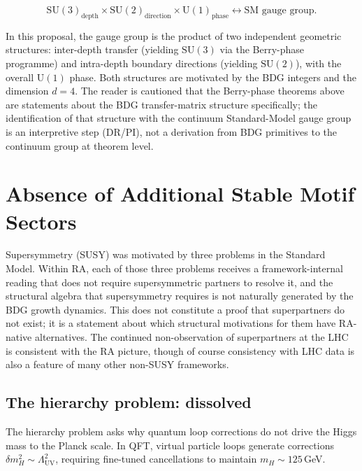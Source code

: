 \documentclass[11pt]{article}
\begin{document}
\begin{equation}
\boxed{\mathrm{SU}(3)_{\mathrm{depth}}\times\mathrm{SU}(2)_{\mathrm{direction}}\times\mathrm{U}(1)_{\mathrm{phase}} \leftrightarrow \text{SM gauge group}.}
\end{equation}

In this proposal, the gauge group is the product of two independent geometric structures: inter-depth transfer (yielding $\mathrm{SU}(3)$ via the Berry-phase programme) and intra-depth boundary directions (yielding $\mathrm{SU}(2)$), with the overall $\mathrm{U}(1)$ phase. Both structures are motivated by the BDG integers and the dimension $d=4$. The reader is cautioned that the Berry-phase theorems above are statements about the BDG transfer-matrix structure specifically; the identification of that structure with the continuum Standard-Model gauge group is an interpretive step (DR/PI), not a derivation from BDG primitives to the continuum group at theorem level.

\section{Absence of Additional Stable Motif Sectors}
\label{sec:susy}

Supersymmetry (SUSY) was motivated by three problems in the Standard Model. Within RA, each of those three problems receives a framework-internal reading that does not require supersymmetric partners to resolve it, and the structural algebra that supersymmetry requires is not naturally generated by the BDG growth dynamics. This does not constitute a proof that superpartners do not exist; it is a statement about which structural motivations for them have RA-native alternatives. The continued non-observation of superpartners at the LHC is consistent with the RA picture, though of course consistency with LHC data is also a feature of many other non-SUSY frameworks.

\subsection{The hierarchy problem: dissolved}

The hierarchy problem asks why quantum loop corrections do not drive the Higgs mass to the Planck scale. In QFT, virtual particle loops generate corrections $\delta m_H^2\sim\Lambda_{\mathrm{UV}}^2$, requiring fine-tuned cancellations to maintain $m_H\sim 125$\,GeV.
\end{document}
